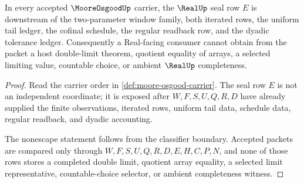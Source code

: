 \begin{theorem}\label{thm:moore-osgood-real-seal-nonescape}
In every accepted $\MooreOsgoodUp$ carrier, the $\RealUp$ seal row $E$ is downstream of the two-parameter window family, both iterated rows, the uniform tail ledger, the cofinal schedule, the regular readback row, and the dyadic tolerance ledger. Consequently a Real-facing consumer cannot obtain from the packet a host double-limit theorem, quotient equality of arrays, a selected limiting value, countable choice, or ambient $\RealUp$ completeness.
\end{theorem}
\begin{proof}
Read the carrier order in \autoref{def:moore-osgood-carrier}. The seal row $E$ is not an independent coordinate; it is exposed after $W,F,S,U,Q,R,D$ have already supplied the finite observations, iterated rows, uniform tail data, schedule data, regular readback, and dyadic accounting.

The nonescape statement follows from the classifier boundary. Accepted packets are compared only through $W,F,S,U,Q,R,D,E,H,C,P,N$, and none of those rows stores a completed double limit, quotient array equality, a selected limit representative, countable-choice selector, or ambient completeness witness.
\end{proof}




